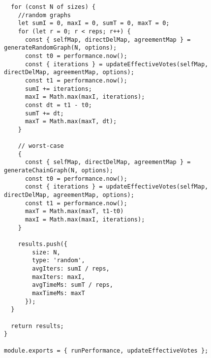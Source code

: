 \begin{verbatim}
  for (const N of sizes) {
    //random graphs
    let sumI = 0, maxI = 0, sumT = 0, maxT = 0;
    for (let r = 0; r < reps; r++) {
      const { selfMap, directDelMap, agreementMap } = generateRandomGraph(N, options);
      const t0 = performance.now();
      const { iterations } = updateEffectiveVotes(selfMap, directDelMap, agreementMap, options);
      const t1 = performance.now();
      sumI += iterations;
      maxI = Math.max(maxI, iterations);
      const dt = t1 - t0;
      sumT += dt;
      maxT = Math.max(maxT, dt);
    }

    // worst-case
    {
      const { selfMap, directDelMap, agreementMap } = generateChainGraph(N, options);
      const t0 = performance.now();
      const { iterations } = updateEffectiveVotes(selfMap, directDelMap, agreementMap, options);
      const t1 = performance.now();
      maxT = Math.max(maxT, t1-t0)
      maxI = Math.max(maxI, iterations);
    }

    results.push({
        size: N,
        type: 'random',
        avgIters: sumI / reps,
        maxIters: maxI,
        avgTimeMs: sumT / reps,
        maxTimeMs: maxT
      });
  }

  return results;
}

module.exports = { runPerformance, updateEffectiveVotes };

\end{verbatim}